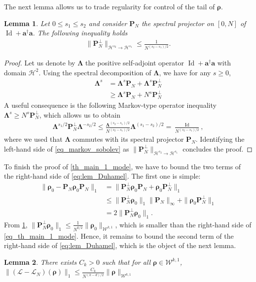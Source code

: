 \documentclass{article}
\newtheorem{lemma}{Lemma}
\newcommand{\xL}{\mathcal{L}}
\newcommand{\xH}{\mathcal{H}}
\newcommand{\xW}{\mathcal{W}}
\let\bf\boldsymbol
\newcommand{\Id}{\operatorname{Id}}
\newcommand{\orho}{{\bf \rho}}
\newcommand{\oa}{{\bf a}}
\newcommand{\oP}{{\bf P}}
\newcommand{\oLambda}{{\bf \Lambda}}
\begin{document}
The next lemma allows us to trade regularity for control of the tail of $\orho$.
\begin{lemma}
    \label{lem:reg_vs_rate}
    Let $0 \leq s_1 \leq s_2$ and consider $\oP_N$ the spectral projector on $[0,N]$ of $\Id + \oa^\dag \oa$. The following inequality holds
    \begin{align}
        \|\oP_N^\perp\|_{\xH^{s_2}\to \xH^{s_1}}\leq \frac{1}{N^{(s_2-s_1)/2}}.
    \end{align}
\end{lemma}
\begin{proof}
    Let us denote by $\oLambda$ the positive self-adjoint operator $\Id + \oa^\dag \oa$ with domain $\xH^{2}$. Using the spectral decomposition of $\oLambda$, we have for any $s \geq 0$,
    \begin{align}
    \oLambda ^s&=\oLambda^s \oP_N + \oLambda^s \oP_N^\perp\\
    & \geq \oLambda^s \oP_N + N^s \oP_N^\perp
    \end{align}
    A useful consequence is the following Markov-type operator inequality $\oLambda ^s \geq N^s \oP_N^\perp$, which allows us to obtain
    \begin{align}
        \label{eq_markov_sobolev}
        \oLambda^{s_1/2}\oP_N^\perp \oLambda^{-s_2/2}\leq \frac{\oLambda^{(s_2-s_1)/2}}{N^{(s_2-s_1)/2}} \oLambda^{(s_1-s_2)/2}=\frac{\Id}{N^{(s_2-s_1)/2}},
    \end{align}
    where we used that $\oLambda$ commutes with its spectral projector $\oP_N$. Identifying the left-hand side of \cref{eq_markov_sobolev} as $\|\oP_N^\perp\|_{\xH^{s_2}\to \xH^{s_1}}$ concludes the proof.
\end{proof}

To finish the proof of \cref{th_main_1_mode}, we have to bound the two terms of the right-hand side of \cref{eq:lem_Duhamel}. The first one is simple:
\begin{align}
    \| \orho_0-\oP_N \orho_0 \oP_N\|_1 &= \| \oP_N^\perp \orho_0 \oP_N + \orho_0 \oP_N^\perp\|_1\\
    &\leq \| \oP_N^\perp \orho_0\|_1 \|\oP_N\|_\infty + \|\orho_0 \oP_N^\perp\|_1\\
    &=2 \| \oP_N^\perp \orho_0\|_1.
\end{align}
From \cref{lem:reg_vs_rate}, $\| \oP_N^\perp \orho_0\|_1\leq  \frac{1}{N^{k/2}}\|\orho_0\|_{\xW^{k,1}}$, which is smaller than the right-hand side of \cref{eq_th_main_1_mode}. Hence, it remains to bound the second term of the right-hand side of \cref{eq:lem_Duhamel}, which is the object of the next lemma.
\begin{lemma}
    \label{lem:key_estimate}
    There exists $C_k>0$ such that for all $\orho\in \xW^{k,1}$,
    $\| (\xL-\xL_N)(\orho)\|_1\leq \frac{C_k}{N^{(k-d)/2}} \|\orho\|_{\xW^{k,1}}$
\end{lemma}
\end{document}
